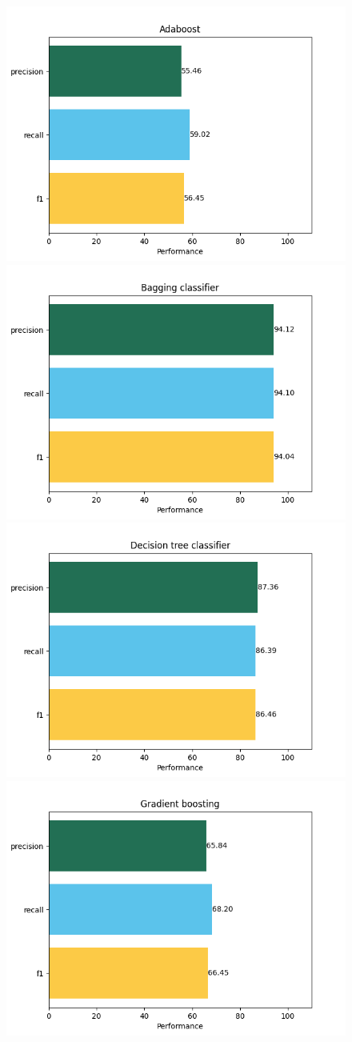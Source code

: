 \documentclass[a4paper]{article}
\begin{document}
    \begin{figure}[!h]
        \centering
        \includegraphics[width=0.4\linewidth]{scores/ada boost.png}
        \includegraphics[width=0.4\linewidth]{scores/bagging classifier.png}
        \includegraphics[width=0.4\linewidth]{scores/decision tree classifier.png}
        \includegraphics[width=0.4\linewidth]{scores/gradient boosting.png}
    \end{figure}
\end{document}
